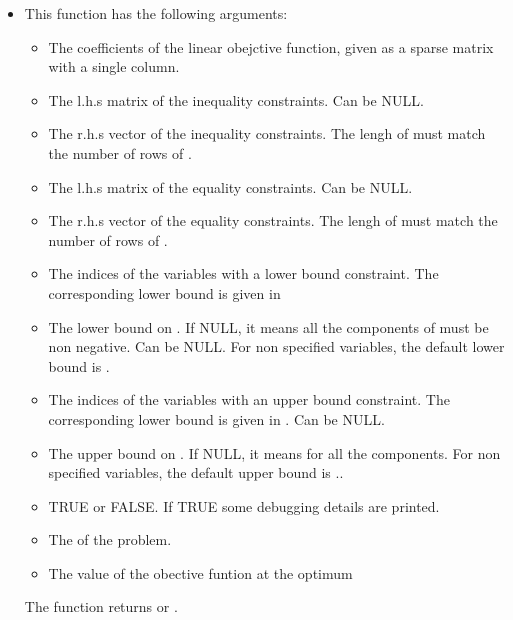 \begin{itemize}
  \item {}
    \sshortdescribe This function has the following arguments:
    \begin{itemize}
      \item {} The coefficients of the linear obejctive function, given as a sparse
        matrix with a single column.
      \item {} The l.h.s matrix of the inequality constraints. Can be NULL.
      \item {} The r.h.s vector of the inequality constraints. The lengh of
         must match the number of rows of .
      \item {} The l.h.s matrix of the equality constraints. Can be NULL.
      \item {} The r.h.s vector of the equality constraints. The lengh of
         must match the number of rows of .
      \item {} The indices of the variables with a lower bound constraint.
        The corresponding lower bound is given in 
      \item {} The lower bound on . If NULL, it means all the components
        of  must be non negative. Can be NULL. For non specified variables, the
        default lower bound is .
      \item {} The indices of the variables with an upper bound constraint.
        The corresponding lower bound is given in . Can be NULL.
      \item {} The upper bound on . If NULL, it means  for
        all the components. For non specified variables, the
        default upper bound is ..
      \item {} TRUE or FALSE. If TRUE some debugging details are printed.
      \item {} The  of the problem.
      \item {} The value of the obective funtion at the optimum 
    \end{itemize}
    The function returns  or .
\end{itemize}


